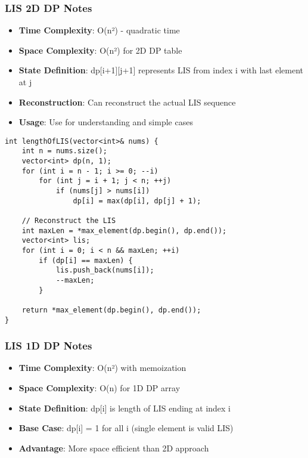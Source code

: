 \documentclass[11pt,a4paper]{article}
\begin{document}
\subsubsection*{LIS 2D DP Notes}
\begin{itemize}
\item \textbf{Time Complexity}: O(n²) - quadratic time
\item \textbf{Space Complexity}: O(n²) for 2D DP table
\item \textbf{State Definition}: dp[i+1][j+1] represents LIS from index i with last element at j
\item \textbf{Reconstruction}: Can reconstruct the actual LIS sequence
\item \textbf{Usage}: Use for understanding and simple cases
\end{itemize}

\newpage
\begin{lstlisting}[caption={LIS - 1D DP Bottom-Up Implementation}]
int lengthOfLIS(vector<int>& nums) {
    int n = nums.size();
    vector<int> dp(n, 1);
    for (int i = n - 1; i >= 0; --i)
        for (int j = i + 1; j < n; ++j)
            if (nums[j] > nums[i])
                dp[i] = max(dp[i], dp[j] + 1);

    // Reconstruct the LIS
    int maxLen = *max_element(dp.begin(), dp.end());
    vector<int> lis;
    for (int i = 0; i < n && maxLen; ++i)
        if (dp[i] == maxLen) {
            lis.push_back(nums[i]);
            --maxLen;
        }

    return *max_element(dp.begin(), dp.end());
}
\end{lstlisting}

\subsubsection*{LIS 1D DP Notes}
\begin{itemize}
\item \textbf{Time Complexity}: O(n²) with memoization
\item \textbf{Space Complexity}: O(n) for 1D DP array
\item \textbf{State Definition}: dp[i] is length of LIS ending at index i
\item \textbf{Base Case}: dp[i] = 1 for all i (single element is valid LIS)
\item \textbf{Advantage}: More space efficient than 2D approach
\end{itemize}
\end{document}
